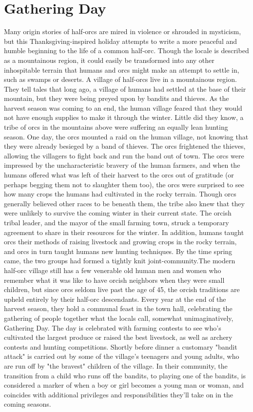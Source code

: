 \documentclass[10pt,a4paper,twoside,bg=print,twocolumn,openany,nodeprecatedcode]{dndbook}
\begin{document}
\section{Gathering Day}
Many origin stories of half-orcs are mired in violence or shrouded in mysticism, but this Thanksgiving-inspired holiday attempts to write a more peaceful and humble beginning to the life of a common half-orc. Though the locale is described as a mountainous region, it could easily be transformed into any other inhospitable terrain that humans and orcs might make an attempt to settle in, such as swamps or deserts.
A village of half-orcs live in a mountainous region. They tell tales that long ago, a village of humans had settled at the base of their mountain, but they were being preyed upon by bandits and thieves. As the harvest season was coming to an end, the human village feared that they would not have enough supplies to make it through the winter. Little did they know, a tribe of orcs in the mountains above were suffering an equally lean hunting season.
One day, the orcs mounted a raid on the human village, not knowing that they were already besieged by a band of thieves. The orcs frightened the thieves, allowing the villagers to fight back and run the band out of town. The orcs were impressed by the uncharacteristic bravery of the human farmers, and when the humans offered what was left of their harvest to the orcs out of gratitude (or perhaps begging them not to slaughter them too), the orcs were surprised to see how many crops the humans had cultivated in the rocky terrain. Though orcs generally believed other races to be beneath them, the tribe also knew that they were unlikely to survive the coming winter in their current state.
The orcish tribal leader, and the mayor of the small farming town, struck a temporary agreement to share in their resources for the winter. In addition, humans taught orcs their methods of raising livestock and growing crops in the rocky terrain, and orcs in turn taught humans new hunting techniques. By the time spring came, the two groups had formed a tightly knit joint-community.The modern half-orc village still has a few venerable old human men and women who remember what it was like to have orcish neighbors when they were small children, but since orcs seldom live past the age of 45, the orcish traditions are upheld entirely by their half-orc descendants. Every year at the end of the harvest season, they hold a communal feast in the town hall, celebrating the gathering of people together what the locals call, somewhat unimaginatively, Gathering Day.
The day is celebrated with farming contests to see who's cultivated the largest produce or raised the best livestock, as well as archery contests and hunting competitions. Shortly before dinner a customary "bandit attack" is carried out by some of the village's teenagers and young adults, who are run off by "the bravest" children of the village. In their community, the transition from a child who runs off the bandits, to playing one of the bandits, is considered a marker of when a boy or girl becomes a young man or woman, and coincides with additional privileges and responsibilities they'll take on in the coming seasons.
\end{document}
